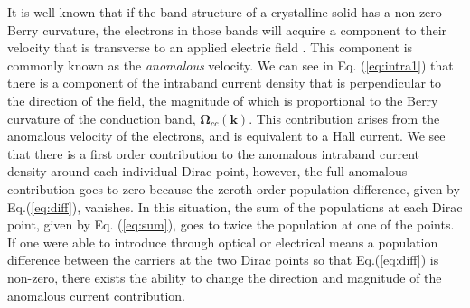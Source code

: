 \documentclass[twocolumn,secnumarabic,amssymb, nobibnotes, aps, prd, superscriptaddress]{revtex4-1}
\begin{document}
It is well known that if the band structure of a crystalline solid has a non-zero Berry curvature, the electrons in those bands will acquire a component to their velocity that is transverse to an applied electric field \cite{xiao2010berry}. This component is commonly known as the \textit{anomalous} velocity. We can see in Eq. (\ref{eq:intra1}) that there is a component of the intraband current density that is perpendicular to the direction of the field, the magnitude of which is proportional to the Berry curvature of the conduction band, $\mathbf{\Omega}_{cc}(\mathbf{k})$. This contribution arises from the anomalous velocity of the electrons, and is equivalent to a Hall current. We see that there is a first order contribution to the anomalous intraband current density around each individual Dirac point, however, the full anomalous contribution goes to zero because the zeroth order population difference, given by Eq.(\ref{eq:diff}), vanishes. In this situation, the sum of the populations at each Dirac point, given by Eq. (\ref{eq:sum}), goes to twice the population at one of the points. If one were able to introduce through optical or electrical means a population difference between the carriers at the two Dirac points so that Eq.(\ref{eq:diff}) is non-zero, there exists the ability to change the direction and magnitude of the anomalous current contribution. 
\end{document}
